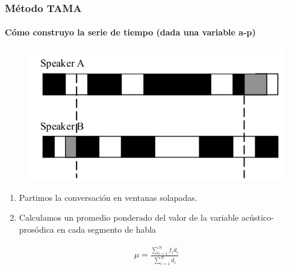 \begin{frame}
  \frametitle{Método TAMA}
  \framesubtitle{Cómo construyo la serie de tiempo (dada una variable a-p)}
  \begin{figure}[t]
    \includegraphics[scale=0.25]{images/tama.png}
  \end{figure}


  \begin{enumerate}
    \item Partimos la conversación en ventanas solapadas.
    \item Calculamos un promedio ponderado del valor de la variable acústico-prosódica en cada segmento de habla
  \end{enumerate}

  \begin{align*}
    \mu = \frac{\sum\limits_{i=1}^N f_i d_i}{\sum\limits_{i=1}^N d_i}
  \end{align*}
\end{frame}


